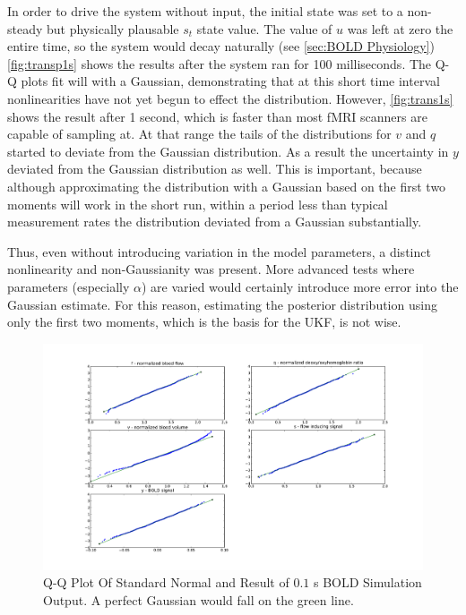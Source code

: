In order to drive the system without input, the initial state was set
to a non-steady but physically 
plausable $s_t$ state value. The value of $u$ was left at zero 
the entire time, so the 
system would decay naturally (see \autoref{sec:BOLD Physiology})
\autoref{fig:transp1s} shows the results after the
system ran for 100 milliseconds. 
The Q-Q plots fit will with a Gaussian, demonstrating that at this short
time interval nonlinearities have not yet begun to effect the distribution.
However, \autoref{fig:trans1s} shows the result after 1 second, which is faster
than most \ac{fMRI} scanners are capable of sampling at. At that range the tails 
of the distributions for $v$ and $q$ started to deviate from the
Gaussian distribution. As a result the uncertainty in $y$ deviated from
the Gaussian distribution as well. This is important, because although 
approximating the distribution with a Gaussian based on the first two
moments will work in the short run, within a period less than typical
measurement rates the distribution deviated from a Gaussian substantially. 

Thus, even without introducing variation in the model parameters,
a distinct nonlinearity and non-Gaussianity was present. 
More advanced tests where parameters (especially $\alpha$) are varied
would certainly introduce more error into the Gaussian estimate. 
For this reason, estimating the posterior distribution using only 
the first two moments, which is the basis for the \ac{UKF}, is not wise. 

\begin{figure}
\centering
\includegraphics[trim=6cm .75cm 6cm .75cm,width=16cm]{images/gauss_step_point1sec_3sigma.pdf}
\caption[Q-Q Plot Of Standard Normal and Result of $0.1$ s BOLD Simulation Output]
{Q-Q Plot Of Standard Normal and Result of $0.1$ s BOLD Simulation Output. A
perfect Gaussian would fall on the green line.}
\label{fig:transp1s}
\end{figure}

